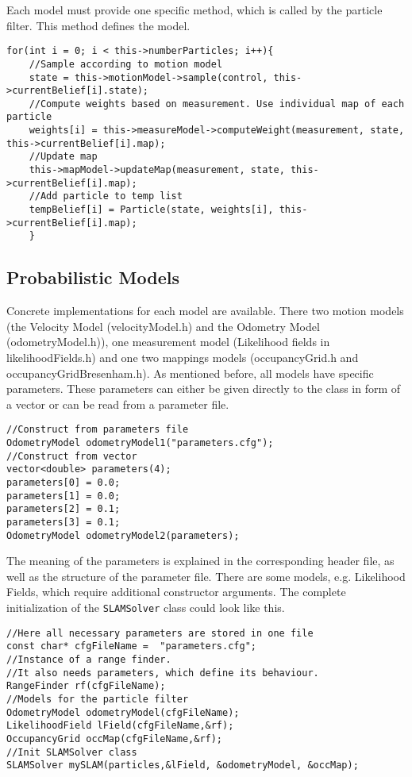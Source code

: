 \documentclass{article}
\newcommand{\SLAM}{\texttt{SLAMSolver} class }
\begin{document}
Each model must provide one specific method, which is called by the particle filter. This method defines the model.
\begin{lstlisting}
for(int i = 0; i < this->numberParticles; i++){
    //Sample according to motion model
    state = this->motionModel->sample(control, this->currentBelief[i].state);
    //Compute weights based on measurement. Use individual map of each particle
    weights[i] = this->measureModel->computeWeight(measurement, state, this->currentBelief[i].map);
    //Update map 
    this->mapModel->updateMap(measurement, state, this->currentBelief[i].map);
    //Add particle to temp list
    tempBelief[i] = Particle(state, weights[i], this->currentBelief[i].map);
    }
\end{lstlisting}
\newpage
\subsection{Probabilistic Models}
Concrete implementations for each model are available. There two motion models (the Velocity Model (velocityModel.h) and the Odometry Model (odometryModel.h)), one measurement model (Likelihood fields in likelihoodFields.h) and one two mappings models (occupancyGrid.h and occupancyGridBresenham.h). As mentioned before, all models have specific parameters. These parameters can either be given directly to the class in form of a vector or can be read from a parameter file. 
\begin{lstlisting}
//Construct from parameters file
OdometryModel odometryModel1("parameters.cfg");
//Construct from vector
vector<double> parameters(4);
parameters[0] = 0.0;
parameters[1] = 0.0;
parameters[2] = 0.1;
parameters[3] = 0.1;
OdometryModel odometryModel2(parameters);
\end{lstlisting}
The meaning of the parameters is explained in the corresponding header file, as well as the structure of the parameter file. There are some models, e.g. Likelihood Fields, which require additional constructor arguments. The complete initialization of the \SLAM could look like this.
\begin{lstlisting}
//Here all necessary parameters are stored in one file
const char* cfgFileName =  "parameters.cfg"; 
//Instance of a range finder.
//It also needs parameters, which define its behaviour.
RangeFinder rf(cfgFileName);
//Models for the particle filter
OdometryModel odometryModel(cfgFileName);
LikelihoodField lField(cfgFileName,&rf);
OccupancyGrid occMap(cfgFileName,&rf);
//Init SLAMSolver class
SLAMSolver mySLAM(particles,&lField, &odometryModel, &occMap);
\end{lstlisting} 
\newpage
\end{document}
